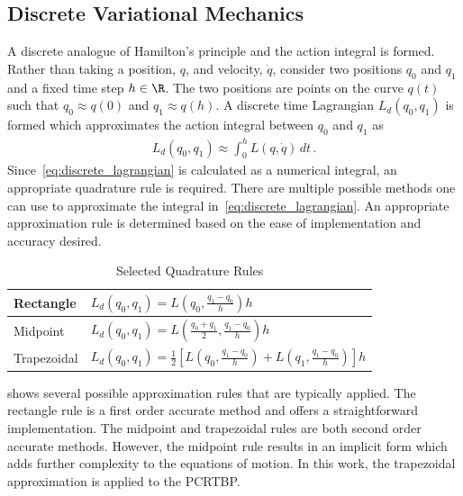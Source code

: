 \subsection{Discrete Variational Mechanics}
A discrete analogue of Hamilton's principle and the action integral is formed.
Rather than taking a position, \( q \), and velocity, \( \dot{q} \), consider two positions \( q_0 \) and \( q_1 \) and a fixed time step \( h \in \R \).
The two positions are points on the curve \( q(t) \) such that \( q_0 \approx q(0) \) and \( q_1 \approx q(h) \).
A discrete time Lagrangian \( L_d( q_0, q_1) \) is formed which approximates the action integral between \( q_0 \) and \( q_1 \) as 
\begin{align}\label{eq:discrete_lagrangian}
	L_d\left( q_0 , q_1 \right) \approx \int_{0}^{h} L \left( q , \dot{q} \right) \, dt \, .
\end{align}
Since~\cref{eq:discrete_lagrangian} is calculated as a numerical integral, an appropriate quadrature rule is required.
There are multiple possible methods one can use to approximate the integral in~\cref{eq:discrete_lagrangian}.
An appropriate approximation rule is determined based on the ease of implementation and accuracy desired.
\begin{table}[htbp]
\caption{Selected Quadrature Rules\label{tab:quadrature}}
\begin{center}
\begin{tabular}{l|l}Rectangle & \( L_d(q_0,q_1) =L(q_0,\frac{q_1-q_0}{h}) h \)  \\ \hline
Midpoint & \( L_d(q_0,q_1) = L(\frac{q_0 + q_1}{2},\frac{q_1 - q_0}{h}) h \) \\ \hline
Trapezoidal & \( L_d(q_0, q_1) = \frac{1}{2} \left[ L(q_0, \frac{q_1 - q_0}{h} ) + L(q_1, \frac{q_1 - q_0 }{h} )\right] h \)
\end{tabular} 
\end{center}
\end{table}
 shows several possible approximation rules that are typically applied.
The rectangle rule is a first order accurate method and offers a straightforward implementation.
The midpoint and trapezoidal rules are both second order accurate methods. 
However, the midpoint rule results in an implicit form which adds further complexity to the equations of motion.
In this work, the trapezoidal approximation is applied to the PCRTBP.

